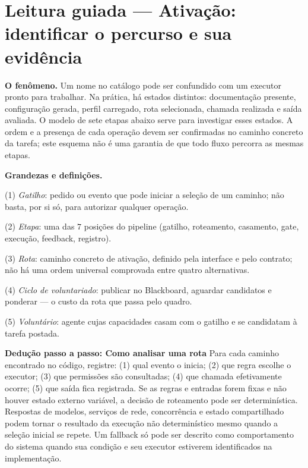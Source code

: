 \section[Leitura guiada]{Leitura guiada — Ativação: identificar o percurso e sua evidência}



\begin{descricao}
\textbf{O fenômeno.} Um nome no catálogo pode ser confundido com um executor
pronto para trabalhar. Na prática, há estados distintos: documentação presente,
configuração gerada, perfil carregado, rota selecionada, chamada realizada e
saída avaliada. O modelo de sete etapas abaixo serve para investigar esses
estados. A ordem e a presença de cada operação devem ser confirmadas no caminho
concreto da tarefa; este esquema não é uma garantia de que todo fluxo percorra
as mesmas etapas.
\end{descricao}

\begin{definicao}
\textbf{Grandezas e definições.}\par
(1) \emph{Gatilho}: pedido ou evento que pode iniciar a seleção de um caminho; não basta, por si só, para autorizar qualquer operação.\par
(2) \emph{Etapa}: uma das $7$ posições do pipeline (gatilho, roteamento, casamento, gate, execução, feedback, registro).\par
(3) \emph{Rota}: caminho concreto de ativação, definido pela interface e pelo contrato; não há uma ordem universal comprovada entre quatro alternativas.\par
(4) \emph{Ciclo de voluntariado}: publicar no Blackboard, aguardar candidatos e ponderar --- o custo da rota que passa pelo quadro.\par
(5) \emph{Voluntário}: agente cujas capacidades casam com o gatilho e se candidatam à tarefa postada.
\end{definicao}

\begin{metodo}
\textbf{Dedução passo a passo: Como analisar uma rota}  Para cada caminho encontrado no código,
registre: (1) qual evento o inicia; (2) que regra escolhe o executor; (3) que
permissões são consultadas; (4) que chamada efetivamente ocorre; (5) que saída
fica registrada. Se as regras e entradas forem fixas e não houver estado externo
variável, a decisão de roteamento pode ser determinística. Respostas de modelos,
serviços de rede, concorrência e estado compartilhado podem tornar o resultado
da execução não determinístico mesmo quando a seleção inicial se repete. Um
fallback só pode ser descrito como comportamento do sistema quando sua condição
e seu executor estiverem identificados na implementação.
\end{metodo}


